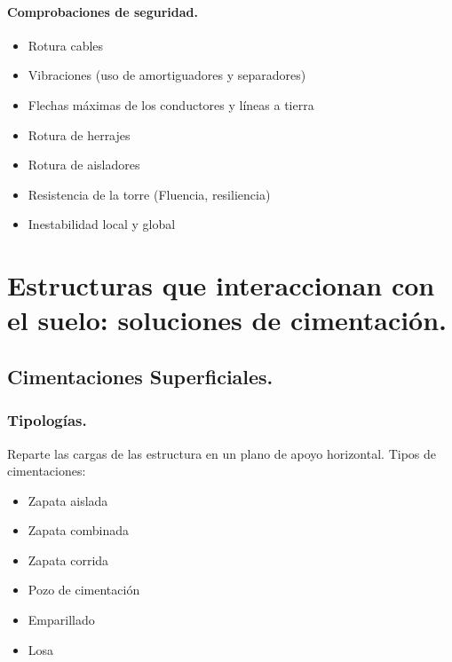 \paragraph{Comprobaciones de seguridad.}
\begin{itemize}
    \item Rotura cables
    \item Vibraciones (uso de amortiguadores y separadores)
    \item Flechas máximas de los conductores y líneas a tierra
    \item Rotura de herrajes
    \item Rotura de aisladores
    \item Resistencia de la torre (Fluencia, resiliencia)
    \item Inestabilidad local y global
\end{itemize}



\section{Estructuras que interaccionan con el suelo: soluciones de cimentación.}

\subsection{Cimentaciones Superficiales.}
\subsubsection{Tipologías.}
Reparte las cargas de las estructura en un plano de apoyo horizontal. Tipos de cimentaciones:
\begin{itemize}
    \item Zapata aislada
    \item Zapata combinada
    \item Zapata corrida
    \item Pozo de cimentación
    \item Emparillado
    \item Losa
\end{itemize}

